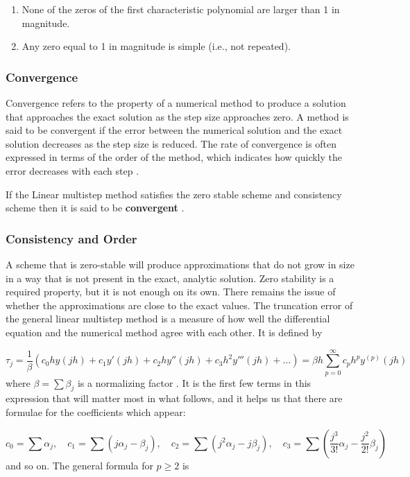  \begin{enumerate}
  \item None of the zeros of the first characteristic polynomial are larger than 1 in magnitude.
  \item Any zero equal to 1 in magnitude is simple (i.e., not repeated).
\end{enumerate}

\subsubsection*{Convergence} 
Convergence refers to the property of a numerical method to produce a solution that approaches the exact solution as the step size approaches zero. A method is said to be convergent if the error between the numerical solution and the exact solution decreases as the step size is reduced. The rate of convergence is often expressed in terms of the order of the method, which indicates how quickly the error decreases with each step \cite{2022JFatokunEtAl}.


If the Linear multistep method satisfies the zero stable scheme and consistency scheme then it is said to be \textbf{convergent} \cite{2022JFatokunEtAl}.

\subsubsection*{Consistency and Order}
A scheme that is zero-stable will produce approximations that do not grow in size in a way that is not present in the exact, analytic solution. Zero stability is a required property, but it is not enough on its own. There remains the issue of whether the approximations are close to the exact values. The truncation error of the general linear multistep method is a measure of how well the differential equation and the numerical method agree with each other. It is defined by


\begin{equation}
  \tau_j = \frac{1}{\beta} \left( c_0 h y(jh) + c_1 y'(jh) + c_2 h y''(jh) + c_3 h^2 y'''(jh) + \ldots \right) = \beta h \sum_{p=0}^{\infty} c_p h^p y^{(p)}(jh)
\end{equation}
where $\beta = \sum \beta_j$ is a normalizing factor \cite{2022JFatokunEtAl}.
It is the first few terms in this expression that will matter most in what follows, and it helps us that there are formulae for the coefficients which appear:


\begin{equation}
  c_0 = \sum \alpha_j, \quad c_1 = \sum (j\alpha_j - \beta_j), \quad c_2 = \sum \left( j^2 \alpha_j - j \beta_j \right), \quad c_3 = \sum \left( \frac{j^3}{3!} \alpha_j - \frac{j^2}{2!} \beta_j \right)
\end{equation}
and so on. The general formula for $p \geq 2$ is

